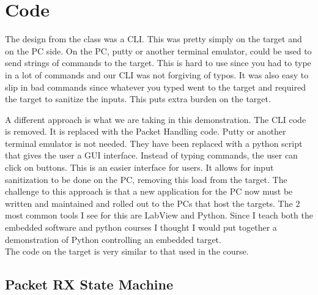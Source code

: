 \documentclass[12pt, svgnames, titlepage]{report}
\begin{document}
\section{Code}

\noindent The design from the class was a CLI.  This was pretty simply on the target and on the PC side.  On the PC, putty or another terminal emulator, could be used to send strings of commands to the target.  This is hard to use since you had to type in a lot of commands and our CLI was not forgiving of typos.  It was also easy to slip in bad commands since whatever you typed went to the target and required the target to sanitize the inputs.  This puts extra burden on the target.\\

\vspace{0.5cm}

\noindent A different approach is what we are taking in this demonstration.  The CLI code is removed.  It is replaced with the Packet Handling code.  Putty or another terminal emulator is not needed.  They have been replaced with a python script that gives the user a GUI interface.  Instead of typing commands, the user can click on buttons.  This is an easier interface for users.  It allows for input sanitization to be done on the PC, removing this load from the target.  The challenge to this approach is that a new application for the PC now must be written and maintained and rolled out to the PCs that host the targets.  The 2 most common tools I see for this are LabView and Python.  Since I teach both the embedded software and python courses I thought I would put together a demonstration of Python controlling an embedded target.  \\

\vspace{0.5cm}
\noindent The code on the target is very similar to that used in the course.  

\subsection{Packet RX State Machine}
\end{document}
